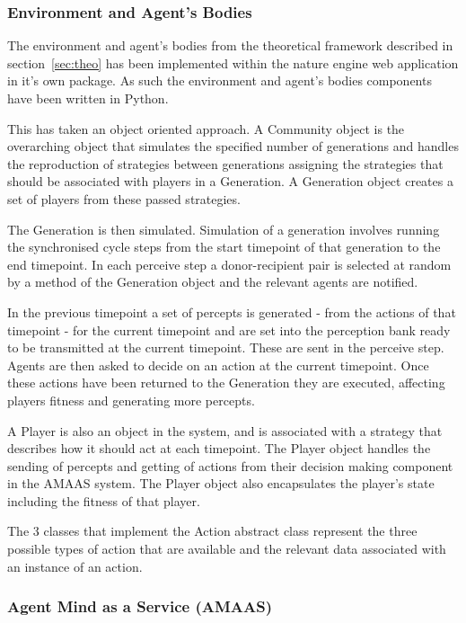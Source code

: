 \documentclass[]{final_report}
\begin{document}
\subsubsection{Environment and Agent's Bodies}
The environment and agent's bodies from the theoretical framework described in section~\ref{sec:theo} has been implemented within the nature engine web application in it's own package. As such the environment and agent's bodies components have been written in Python.\par 
This has taken an object oriented approach. A Community object is the overarching object that simulates the specified number of generations and handles the reproduction of strategies between generations assigning the strategies that should be associated with players in a Generation. A Generation object creates a set of players from these passed strategies.\par 
The Generation is then simulated. Simulation of a generation involves running the synchronised cycle steps from the start timepoint of that generation to the end timepoint. In each perceive step a donor-recipient pair is selected at random by a method of the Generation object and the relevant agents are notified.\par 
In the previous timepoint a set of percepts is generated - from the actions of that timepoint - for the current timepoint and are set into the perception bank ready to be transmitted at the current timepoint. These are sent in the perceive step. Agents are then asked to decide on an action at the current timepoint. Once these actions have been returned to the Generation they are executed, affecting players fitness and generating more percepts.\par 
A Player is also an object in the system, and is associated with a strategy that describes how it should act at each timepoint. The Player object handles the sending of percepts and getting of actions from their decision making component in the AMAAS system. The Player object also encapsulates the player's state including the fitness of that player.\par 
The 3 classes that implement the Action abstract class represent the three possible types of action that are available and the relevant data associated with an instance of an action.

\subsubsection{Agent Mind as a Service (AMAAS)}
\end{document}

